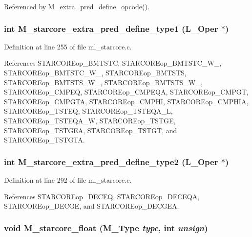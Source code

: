 Referenced by M\_\-extra\_\-pred\_\-define\_\-opcode().
\subsubsection{\setlength{\rightskip}{0pt plus 5cm}int M\_\-starcore\_\-extra\_\-pred\_\-define\_\-type1 (L\_\-Oper $\ast$)}\label{m__starcore_8h_278845f64ace0adc2bbf737febe98c31}




Definition at line 255 of file ml\_\-starcore.c.

References STARCOREop\_\-BMTSTC, STARCOREop\_\-BMTSTC\_\-W\_, STARCOREop\_\-BMTSTC\_\-W\_, STARCOREop\_\-BMTSTS, STARCOREop\_\-BMTSTS\_\-W\_, STARCOREop\_\-BMTSTS\_\-W\_, STARCOREop\_\-CMPEQ, STARCOREop\_\-CMPEQA, STARCOREop\_\-CMPGT, STARCOREop\_\-CMPGTA, STARCOREop\_\-CMPHI, STARCOREop\_\-CMPHIA, STARCOREop\_\-TSTEQ, STARCOREop\_\-TSTEQA\_\-L, STARCOREop\_\-TSTEQA\_\-W, STARCOREop\_\-TSTGE, STARCOREop\_\-TSTGEA, STARCOREop\_\-TSTGT, and STARCOREop\_\-TSTGTA.
\subsubsection{\setlength{\rightskip}{0pt plus 5cm}int M\_\-starcore\_\-extra\_\-pred\_\-define\_\-type2 (L\_\-Oper $\ast$)}\label{m__starcore_8h_1c4ccab23047ea6ff9aeb844d156b333}




Definition at line 292 of file ml\_\-starcore.c.

References STARCOREop\_\-DECEQ, STARCOREop\_\-DECEQA, STARCOREop\_\-DECGE, and STARCOREop\_\-DECGEA.
\subsubsection{\setlength{\rightskip}{0pt plus 5cm}void M\_\-starcore\_\-float (\bf{M\_\-Type} {\em type}, int {\em unsign})}\label{m__starcore_8h_d4a93b318bdff4020f864ce6acf56b45}




